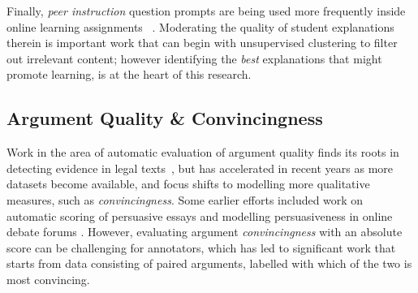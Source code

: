 \documentclass[runningheads]{llncs}
\begin{document}
Finally, \textit{peer instruction} question prompts are being used more 
frequently inside online learning 
assignments~\cite{univeristy_of_british_columbia_ubc/ubcpi_2019}
\cite{charles_harnessing_2019}.
Moderating the quality of student explanations therein is important work that 
can begin with unsupervised clustering to filter out irrelevant 
content\cite{gagnon_filtering_2019}; however identifying the \textit{best} 
explanations that might promote learning, is at the heart of this research.


\subsection{Argument Quality \& Convincingness}

Work in the area of automatic evaluation of argument quality finds its roots in 
detecting evidence in legal texts~\cite{moens_automatic_2007}, but has 
accelerated in recent years as more datasets become available, and focus shifts 
to modelling more qualitative measures, such as \textit{convincingness}. 
Some earlier efforts included work on automatic scoring of persuasive essays 
\cite{persing_end--end_2016} and modelling persuasiveness in online debate 
forums \cite{tan_winning_2016}. 
However, evaluating argument \textit{convincingness} with an absolute score can 
be challenging for annotators, which has led to significant work that starts 
from data consisting of paired arguments, labelled with which of the two is 
most convincing.
\end{document}
